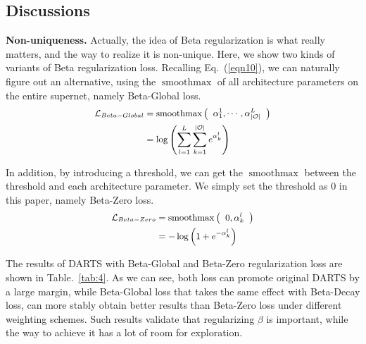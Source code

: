 \documentclass[10pt,twocolumn,letterpaper]{article}
\begin{document}
\subsection{Discussions} 
\noindent\textbf{Non-uniqueness.} Actually, the idea of Beta regularization is what really matters, and the way to realize it is non-unique. Here, we show two kinds of variants of Beta regularization loss. Recalling Eq.~(\ref{eqn10}), we can naturally figure out an alternative, using the $\operatorname{smoothmax}$ of all architecture parameters on the entire supernet, namely Beta-Global loss.
\begin{equation} \label{eqn17}
\small
  \begin{split}
    \mathcal{L}_{Beta-Global}&=\operatorname{smoothmax} \left(\begin{array}{r}\alpha_{1}^1,\cdots ,\alpha_{\left | \mathcal{O}\right |}^L\end{array}\right) \\
    &=\log \left(\sum_{l=1}^{L}\sum_{k=1}^{\left | \mathcal{O}\right |}  e^{\alpha_k^l}\right)
  \end{split}
  \vspace{-6pt}
\end{equation}

In addition, by introducing a threshold, we can get the $\operatorname{smoothmax}$ between the threshold and each architecture parameter. We simply set the threshold as 0 in this paper, namely Beta-Zero loss.
\begin{equation} \label{eqn18}
\small
  \begin{split}
    \mathcal{L}_{Beta-Zero}&=\operatorname{smoothmax} \left(\begin{array}{r}0, \alpha_{k}^l\end{array}\right) \\
    &= -\log \left(1+e^{-\alpha_k^l}\right)
  \end{split}
  \vspace{-6pt}
\end{equation}

The results of DARTS with Beta-Global and Beta-Zero regularization loss are shown in Table.~\ref{tab:4}. As we can see, both loss can promote original DARTS by a large margin, while Beta-Global loss that takes the same effect with Beta-Decay loss, can more stably obtain better results than Beta-Zero loss under different weighting schemes. Such results validate that regularizing $\beta$ is important, while the way to achieve it has a lot of room for exploration.
\end{document}
